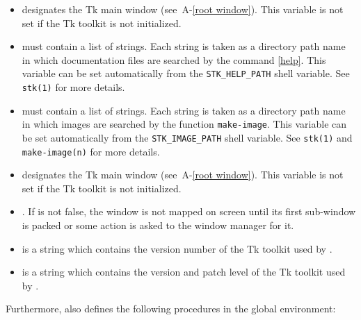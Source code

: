 \begin{itemize}

\item {\tt{}} designates the Tk main
      window (see~A-\ref{root window}). This variable is not set if
      the Tk toolkit is not initialized.

\item {\tt{}} must contain a list of
  strings.  Each string is taken as a directory path name in which
  documentation files are searched by the command \ref{help}. 
  This variable can be set automatically from the {\tt STK\_HELP\_PATH} 
  shell variable. See  {\tt stk(1)} for more details.

\item {\tt{}} must contain 
  a list of  strings.  Each string is taken as a directory path name in which
  images are searched by the function \texttt{make-image}. This variable can be
  set automatically from the {\tt STK\_IMAGE\_PATH} shell variable. See
  {\tt stk(1)}  and {\tt make-image(n)} for more details.

\item {\tt{}} designates the Tk main
      window (see~A-\ref{root window}). This variable is not set if
      the Tk toolkit is not initialized.

\item {\tt{}}. If  
   is not false, the  window 
  is not mapped on screen until its first sub-window is packed or some
  action is asked to the window manager for it.

\item {\tt{}} is a string 
  which contains the version number of the Tk toolkit used by {\stk}.

\item {\tt{}} is
  a string  which contains the version and patch level of the Tk toolkit 
  used by {\stk}.

\end{itemize}

Furthermore, {\stk} also defines the following procedures in the global 
environment:

